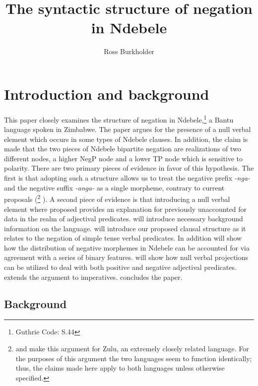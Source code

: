 \documentclass[output=paper]{langsci/langscibook}
\title{The syntactic structure of negation in Ndebele}
\author{%
 Ross Burkholder \affiliation{University of Chicago}
}
\newcommand{\nga}[0]{\textit{-nga- }}
\begin{document}
 

  

\section{Introduction and background}\label{sec:burkholder:1}

This paper closely examines the structure of negation in Ndebele,\footnote{Guthrie Code: S.44} a Bantu language spoken in Zimbabwe. The paper argues for the presence of a null verbal element which occurs in some types of Ndebele clauses. In addition, the claim is made that the two pieces of Ndebele bipartite negation are realizations of two different nodes, a higher NegP node and a lower TP node which is sensitive to polarity. There are two primary pieces of evidence in favor of this hypothesis. The first is that adopting such a structure allows us to treat the negative prefix \nga and the negative suffix \textit{-anga-} as a single morpheme, contrary to current proposals (\citet{Buell2004,Buell2005}\footnote{\citet{Buell2004} and \citeyear{Buell2005} make this argument for Zulu, an extremely closely related language. For the purposes of this argument the two languages seem to function identically; thus, the claims made here apply to both languages unless otherwise specified.} \citealt{Khumalo1981,Khumalo1982,Sibanda2004}). A second piece of evidence is that introducing a null verbal element where proposed provides an explanation for previously unaccounted for data in the realm of adjectival predicates.  will introduce necessary background information on the language.   will introduce our proposed clausal structure as it relates to the negation of simple tense verbal predicates. In addition  will show how the distribution of negative morphemes in Ndebele can be accounted for via agreement with a series of binary features.  will show how null verbal projections can be utilized to deal with both positive and negative adjectival predicates.  extends the argument to imperatives.  concludes the paper. 


\subsection{Background}\label{sec:burkholder:1.1}
\end{document}
